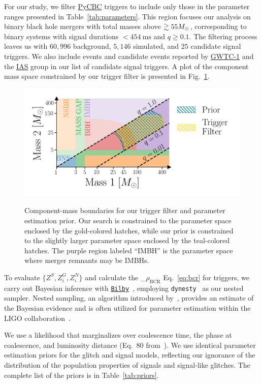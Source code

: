 \documentclass[
 nofootinbib,
 amsmath,amssymb,
 aps,
 twocolumn,
 superscriptaddress
]{revtex4-2}
\newcommand{\bilby}{{\sc \href{https://lscsoft.docs.ligo.org/bilby/}{\texttt{Bilby}}}\xspace}
\newcommand{\dynesty}{{\sc \texttt{dynesty}}\xspace}
\newcommand{\pycbc}{{\sc \href{https://pycbc.org/}{{PyCBC}}}\xspace}
\newcommand{\GWTC}{{\sc \href{https://ui.adsabs.harvard.edu/abs/2019PhRvX...9c1040A/abstract}{{GWTC-1}}}\xspace}
\newcommand{\IAS}{{\sc \href{https://ui.adsabs.harvard.edu/abs/2020PhRvD.101h3030V/abstract}{{IAS}}}\xspace}
\newcommand{\mathcmd}[1]{{\sc \relax\ifmmode#1\else $#1$\fi}\xspace}
\newcommand{\bcr}{\mathcmd{\rho_\text{BCR}}}
\newcommand{\msun}{\mathcmd{M_\odot}}
\begin{document}
For our study, we filter \pycbc triggers to include only those in the parameter ranges presented in Table~\ref{tab:parameters}. This region focuses our analysis on binary black hole mergers with total masses above $\gtrsim55 \msun$, corresponding to binary systems with signal durations $<454 \ \text{ms}$ and $q\geq0.1$. The filtering process leaves us with $60,996$ background, $5,146$ simulated, and $25$ candidate signal triggers. We also include events and candidate events reported by \GWTC and the \IAS group in our list of candidate signal triggers.  A plot of the component mass space constrained by our trigger filter is presented in Fig.~\ref{fig:templateBank}.

\begin{figure}[!ht]
{\centering \includegraphics[width=0.75\linewidth]{images/template_bank.png}
}
\caption[ BCR search space.]{Component-mass boundaries for our trigger filter and parameter estimation prior. Our search is constrained to the parameter space enclosed by the gold-colored hatches, while our prior is constrained to the slightly larger parameter space enclosed by the teal-colored hatches. The purple region labeled ``IMBH'' is the parameter space where merger remnants may be IMBHs.}\label{fig:templateBank}
\end{figure}


To evaluate $\{Z^S, Z^G_i, Z^N_i\}$ and calculate the \bcr Eq.~\ref{eq:bcr} for triggers, we carry out Bayesian inference with \bilby~\cite{bilby, bilby_pipe}, employing \dynesty~\cite{dynesty} as our nested sampler. Nested sampling, an algorithm introduced by~\citet{skilling2004, skilling2006}, provides an estimate of the Bayesian evidence and is often utilized for parameter estimation within the LIGO collaboration~\cite{bilby, bilby_paper, pbilby_paper}.

We use a likelihood that marginalizes over coalescence time, the phase at coalescence, and luminosity distance (Eq.~80 from~\citet{intro_to_gw_bayes}). We use identical parameter estimation priors for the glitch and signal models, reflecting our ignorance of the distribution of the population properties of signals and signal-like glitches. The complete list of the priors is in Table~\ref{tab:priors}. 
\end{document}
